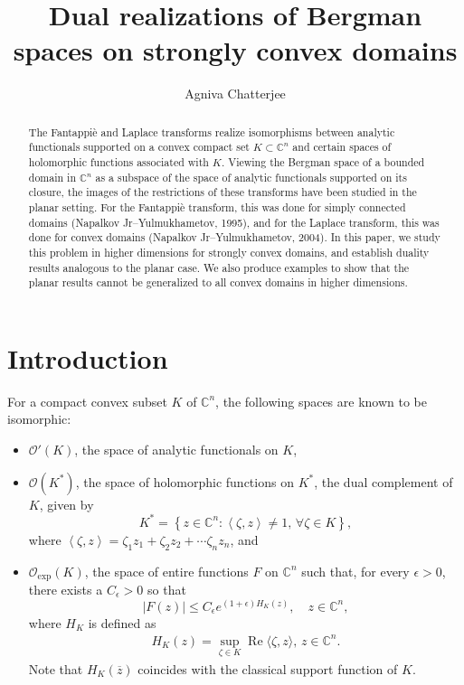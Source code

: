\documentclass[11pt, oneside, reqno]{amsart}
\numberwithin{equation}{section}
\theoremstyle{definition}
\newcommand{\bes} {\begin{equation*}}
\newcommand{\ees} {\end{equation*}}
\newcommand{\bea} {\begin{eqnarray}}
\newcommand{\eea} {\end{eqnarray}}
\newcommand{\hol}{\mathcal {O}}
\newcommand{\C}{\mathbb C}
\newcommand{\Cn}{{\mathbb{C}^n}}
\newcommand{\rea}{\operatorname{Re}}
\newcommand{\eps}{\epsilon}
\begin{document}
\begin{abstract}
The Fantappiè and Laplace transforms realize isomorphisms between analytic functionals supported on a convex compact set $K\subset\Cn$ and certain spaces of holomorphic functions associated with $K$. Viewing the Bergman space of a bounded domain in $\Cn$ as a subspace of the space of analytic functionals supported on its closure, the images of the restrictions of these transforms have been studied in the planar setting. For the Fantappi{\`e} transform, this was done for simply connected domains (Napalkov Jr--Yulmukhametov, 1995), and for the Laplace transform, this was done for convex domains (Napalkov Jr--Yulmukhametov, 2004). In this paper, we study this problem in higher dimensions for strongly convex domains, and establish duality results analogous to the planar case. We also produce examples to show that the planar results cannot be generalized to all convex domains in higher dimensions. 
    
\end{abstract}
\title{Dual realizations of Bergman spaces on strongly convex domains}
\author{Agniva Chatterjee}
\address{Department of Mathematics, Indian Institute of Technology Palakkad, Palakkad, Kerala-678623, India}
\maketitle
\section{Introduction}%
For a compact convex subset $K$ of $\C^n$, the following spaces are known to be isomorphic:
\begin{itemize}
    \item [$(a)$] $\hol'(K)$, the space of analytic functionals on $K$, 
    \item [$(b)$] $\hol(K^*)$, the space of holomorphic functions on $K^*$, the dual complement of $K$, given by 
    \bes 
        K^*=\left\{z\in\C^n: \left\langle\zeta,z\right\rangle\neq 1,\,\forall \zeta\in K\right\},
    \ees 
    where $\left\langle\zeta,z\right\rangle=\zeta_1z_1+\zeta_2z_2+\cdots\zeta_nz_n$, and 
   \label{def:exp fn} \item[$(c)$] $\hol_{\operatorname{\operatorname{exp}}}(K)$, the space of entire functions $F$ on $\C^n$ such that, for every $\eps>0$, there exists a $C_\eps>0$ so that 
    \bes
    |F(z)|\leq C_\eps e^{(1+\eps)H_K(z)},\quad z\in \C^n,
    \ees
    where $H_K$ is defined as
    \bea\label{eq:supprt def}
H_K(z)=\sup\limits_{\zeta\in K}\rea\langle\zeta,z\rangle,\,z\in\C^n.
\eea
Note that $H_K(\overline z)$ coincides with the classical support function of $K$.
\end{itemize}
\end{document}
